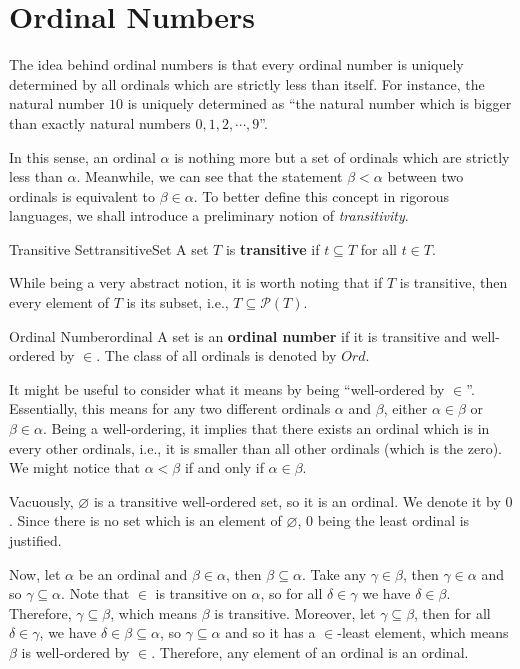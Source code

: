 \documentclass[math]{amznotes}
\theoremstyle{remark}
\begin{document}
\section{Ordinal Numbers}
The idea behind ordinal numbers is that every ordinal number is uniquely determined by all ordinals which are strictly less than itself. For instance, the natural number $10$ is uniquely determined as ``the natural number which is bigger than exactly natural numbers $0, 1, 2, \cdots, 9$''. 

In this sense, an ordinal $\alpha$ is nothing more but a set of ordinals which are strictly less than $\alpha$. Meanwhile, we can see that the statement $\beta < \alpha$ between two ordinals is equivalent to $\beta \in \alpha$. To better define this concept in rigorous languages, we shall introduce a preliminary notion of \textit{transitivity}.
\begin{dfnbox}{Transitive Set}{transitiveSet}
    A set $T$ is {\color{red} \textbf{transitive}} if $t \subseteq T$ for all $t \in T$.
\end{dfnbox}
While being a very abstract notion, it is worth noting that if $T$ is transitive, then every element of $T$ is its subset, i.e., $T \subseteq \mathcal{P}(T)$.
\begin{dfnbox}{Ordinal Number}{ordinal}
    A set is an {\color{red} \textbf{ordinal number}} if it is transitive and well-ordered by $\in$. The class of all ordinals is denoted by $Ord$.
\end{dfnbox}
It might be useful to consider what it means by being ``well-ordered by $\in$''. Essentially, this means for any two different ordinals $\alpha$ and $\beta$, either $\alpha \in \beta$ or $\beta \in \alpha$. Being a well-ordering, it implies that there exists an ordinal which is in every other ordinals, i.e., it is smaller than all other ordinals (which is the zero). We might notice that $\alpha < \beta$ if and only if $\alpha \in \beta$.

Vacuously, $\varnothing$ is a transitive well-ordered set, so it is an ordinal. We denote it by $0$. Since there is no set which is an element of $\varnothing$, $0$ being the least ordinal is justified.

Now, let $\alpha$ be an ordinal and $\beta \in \alpha$, then $\beta \subseteq \alpha$. Take any $\gamma \in \beta$, then $\gamma \in \alpha$ and so $\gamma \subseteq \alpha$. Note that $\in$ is transitive on $\alpha$, so for all $\delta \in \gamma$ we have $\delta \in \beta$. Therefore, $\gamma \subseteq \beta$, which means $\beta$ is transitive. Moreover, let $\gamma \subseteq \beta$, then for all $\delta \in \gamma$, we have $\delta \in \beta \subseteq \alpha$, so $\gamma \subseteq \alpha$ and so it has a $\in$-least element, which means $\beta$ is well-ordered by $\in$. Therefore, any element of an ordinal is an ordinal.
\end{document}
